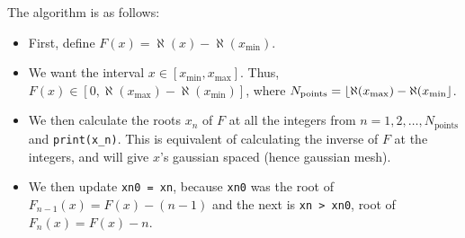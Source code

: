 \documentclass[a4paper,fleqn,12pt]{article}
\begin{document}
The algorithm is as follows:
\begin{itemize}
\item First, define $F(x) = \aleph(x) - \aleph(x_{\text{min}})$.
\item We want the interval $x \in [x_{\text{min}}, x_{\text{max}}]$.
Thus, $F(x) \in [0, \aleph(x_{\text{max}}) - \aleph(x_{\text{min}})]$, where
$N_{\text{points}} = \left\lfloor \aleph(x_{\text{max}}) - \aleph(x_{\text{min}} \right\rfloor$.
\item We then calculate the roots $x_n$ of $F$ at all the integers from $n = 1, 2, \ldots, N_{\text{points}}$ and \texttt{print(x_n)}. This is equivalent of calculating the inverse of $F$ at the integers, and will give $x$'s gaussian spaced (hence gaussian mesh).
\item We then update \texttt{xn0 = xn}, because \texttt{xn0} was the root of $F_{n-1}(x) = F(x) - (n-1)$ and the next is \texttt{xn > xn0}, root of $F_n(x) = F(x) - n$.
\end{itemize}
\end{document}
